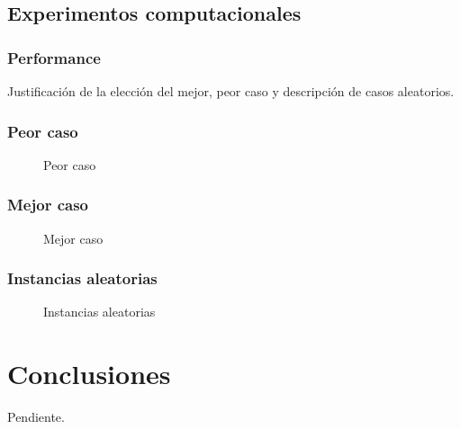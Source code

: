 \documentclass[a4paper, 10pt, twoside]{article}
\begin{document}
\subsection{Experimentos computacionales}

\subsubsection{Performance}
Justificación de la elección del mejor, peor caso y descripción de casos aleatorios.

\subsubsection{Peor caso}

\begin{figure}[H]
  \centering
  
  \caption{Peor caso}
\end{figure}


\subsubsection{Mejor caso}

\begin{figure}[H]
  \centering
  
  \caption{Mejor caso}
\end{figure}


\subsubsection{Instancias aleatorias}

\begin{figure}[H]
  \centering
  
  \caption{Instancias aleatorias}
\end{figure}




\newpage

\section{Conclusiones}

Pendiente.


\end{document}
